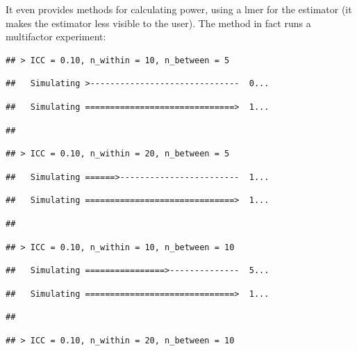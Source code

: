 \documentclass[
]{book}
\begin{document}
It even provides methods for calculating power, using a lmer for the estimator (it makes the estimator less visible to the user).
The method in fact runs a multifactor experiment:

\begin{verbatim}
## > ICC = 0.10, n_within = 10, n_between = 5
\end{verbatim}

\begin{verbatim}
##   Simulating >------------------------------  0...
\end{verbatim}

\begin{verbatim}
##   Simulating ==============================>  1...
\end{verbatim}

\begin{verbatim}
## 
\end{verbatim}

\begin{verbatim}
## > ICC = 0.10, n_within = 20, n_between = 5
\end{verbatim}

\begin{verbatim}
##   Simulating ======>------------------------  1...
\end{verbatim}

\begin{verbatim}
##   Simulating ==============================>  1...
\end{verbatim}

\begin{verbatim}
## 
\end{verbatim}

\begin{verbatim}
## > ICC = 0.10, n_within = 10, n_between = 10
\end{verbatim}

\begin{verbatim}
##   Simulating ================>--------------  5...
\end{verbatim}

\begin{verbatim}
##   Simulating ==============================>  1...
\end{verbatim}

\begin{verbatim}
## 
\end{verbatim}

\begin{verbatim}
## > ICC = 0.10, n_within = 20, n_between = 10
\end{verbatim}
\end{document}
